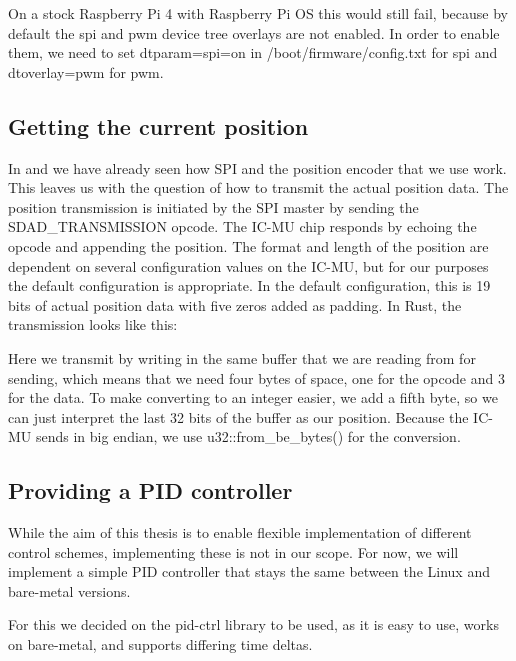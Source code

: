 

On a stock Raspberry Pi 4 with Raspberry Pi OS this would still fail, because by default the spi and pwm device tree overlays are not enabled.
In order to enable them, we need to set dtparam=spi=on in /boot/firmware/config.txt for spi and dtoverlay=pwm for pwm.

\subsection{Getting the current position}

In  and  we have already seen how SPI and the position encoder that we use work.
This leaves us with the question of how to transmit the actual position data.
The position transmission is initiated by the SPI master by sending the SDAD\_TRANSMISSION opcode.
The IC-MU chip responds by echoing the opcode and appending the position.
The format and length of the position are dependent on several configuration values on the IC-MU, but for our purposes the default configuration is appropriate.
In the default configuration, this is 19 bits of actual position data with five zeros added as padding.
In Rust, the transmission looks like this:



Here we transmit by writing in the same buffer that we are reading from for sending, which means that we need four bytes of space, one for the opcode and 3 for the data.
To make converting to an integer easier, we add a fifth byte, so we can just interpret the last 32 bits of the buffer as our position.
Because the IC-MU sends in big endian, we use u32::from\_be\_bytes() for the conversion.

\subsection{Providing a PID controller}

While the aim of this thesis is to enable flexible implementation of different control schemes, implementing these is not in our scope.
For now, we will implement a simple PID controller that stays the same between the Linux and bare-metal versions.

For this we decided on the pid-ctrl library to be used, as it is easy to use, works on bare-metal, and supports differing time deltas.

